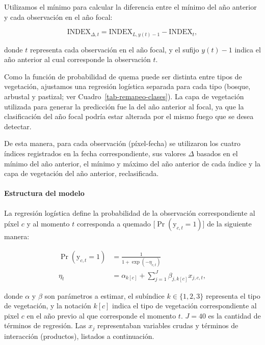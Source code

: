 \documentclass[11pt,a4paper]{article}
\begin{document}
Utilizamos el mínimo para calcular la diferencia entre el mínimo del año anterior y cada observación en el año focal:

\[ \mathrm{INDEX}_{\Delta,t} = \mathrm{INDEX}_{L,y(t)-1} - \mathrm{INDEX}_{t}, \]

\noindent donde $t$ representa cada observación en el año focal, y el sufijo $y(t)-1$ indica el año anterior al cual corresponde la observación $t$.

Como la función de probabilidad de quema puede ser distinta entre tipos de vegetación, ajustamos una regresión logística separada para cada tipo (bosque, arbustal y pastizal; ver Cuadro~\ref{tab-remapeo-clases}). La capa de vegetación utilizada para generar la predicción fue la del año anterior al focal, ya que la clasificación del año focal podría estar alterada por el mismo fuego que se desea detectar.

De esta manera, para cada observación (píxel-fecha) se utilizaron los cuatro índices registrados en la fecha correspondiente, sus valores $\Delta$ basados en el mínimo del año anterior, el mínimo y máximo del año anterior de cada índice y la capa de vegetación del año anterior, reclasificada.

\paragraph{Estructura del modelo}

La regresión logística define la probabilidad de la observación correspondiente al píxel $c$ y al momento $t$ corresponda a quemado [$\Pr(\text{y}_{c,t} = 1)$] de la siguiente manera:

\begin{equation}
  \label{eq-logistic}
  \begin{aligned}
    \Pr(\text{y}_{c,t} = 1) &= \frac{1}{1 + \exp(-\eta_{c,t})} \\
    \eta_t &= \alpha_{k[c]} + \sum_{j=1}^J \beta_{j,k[c]} x_{j,c,t},
  \end{aligned}
\end{equation}

\noindent donde $\alpha$ y $\beta$ son parámetros a estimar, el subíndice $k \in \{1, 2, 3\}$ representa el tipo de vegetación, y la notación $k[c]$ indica el tipo de vegetación correspondiente al pixel $c$ en el año previo al que corresponde el momento $t$. $J = 40$ es la cantidad de términos de regresión. Las $x_j$ representaban variables crudas y términos de interacción (productos), listados a continuación.
\end{document}
